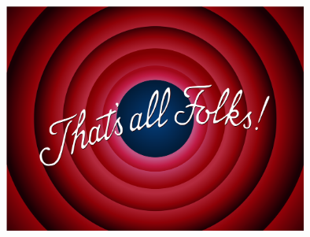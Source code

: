 \documentclass[10pt]{beamer}
\begin{document}
\begin{frame}
	\centering
	\includegraphics[width=0.75\textwidth]{images/thats_all.png}
\end{frame}
\end{document}
